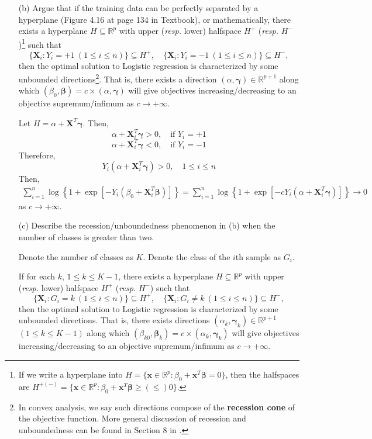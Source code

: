 \documentclass[10pt]{article}
\theoremstyle{definition}
\theoremstyle{remark}
\newcommand{\bx}{\bm{x}}
\newcommand{\Xb}{\mathbf{X}}
\newcommand{\bX}{\bm{X}}
\newcommand{\bbeta}{\bm{\beta}}
\newcommand{\bgamma}{\bm{\gamma}}
\newcommand{\bbR}{\mathbb{R}}
\begin{document}
\begin{enumerate}
\begin{itemize}
		\item [(b)] Argue that if the training data can be perfectly separated by a hyperplane (Figure 4.16 at page 134 in Textbook), or mathematically, there exists a hyperplane $ H \subseteq \bbR^{p} $ with upper (\textit{resp.} lower) halfspace $ H^{+} $ (\textit{resp.} $ H^{-} $)\footnote{If we write a hyperplane into $ H = \{ \bx \in \bbR^{p}: \beta_{0} + \bx^{T}\bbeta = 0 \} $, then the halfspaces are $ H^{+(-)} = \{ \bx \in \bbR^{p}: \beta_{0} + \bx^{T}\bbeta \ge(\le) 0 \} $.} such that 
		\[ \{ \bX_{i}: Y_{i} = + 1\ (1 \le i \le n) \} \subseteq H^{+}, \quad \{ \bX_{i}: Y_{i} = -1\ (1 \le i \le n) \} \subseteq H^{-}, \]
		then the optimal solution to Logistic regression is characterized by some unbounded directions\footnote{In convex analysis, we say such directions compose of the \textbf{recession cone} of the objective function. More general discussion of recession and unboundedness can be found in Section 8 in \cite[Rockafellar (1970)]{rockafellar1970convex}.}. That is, there exists a direction $ (\alpha,\bgamma) \in \bbR^{p+1} $ along which $ (\beta_{0},\bbeta) = c\times (\alpha,\bgamma) $ will give objectives increasing/decreasing to an objective supremum/infimum as $ c \to +\infty $.
		
		Let $ H=\alpha + \Xb^T\bgamma $. Then,
		\[
		\alpha+\bX_{i}^{T}\bgamma >0,\quad \textrm{if~} Y_i=+1
		\]
		\[
		\alpha+\bX_{i}^{T}\bgamma <0,\quad \textrm{if~} Y_i=-1
		\]
		Therefore,
		\[
		Y_i(\alpha+\bX_{i}^{T}\bgamma) > 0, \quad 1\le i\le n
		\]
		Then,
		\begin{align*}
		    \sum_{i=1}^{n} \log\left\{ 1 + \exp\left[ -Y_{i}(\beta_{0}+\bX_{i}^{T}\bbeta) \right]  \right\} = \sum_{i=1}^{n} \log\left\{ 1 + \exp\left[ -cY_{i}(\alpha+\bX_{i}^{T}\bgamma) \right]  \right\} \to 0
		\end{align*}
		as $c \to +\infty$.
		
		\item [(c)] Describe the recession/unboundedness phenomenon in (b) when the number of classes is greater than two.
		
		Denote the number of classes as $K$. Denote the class of the $i$th sample as $G_i$.
		
		If for each $k$, $1\le k\le K-1$, there exists a hyperplane $ H \subseteq \bbR^{p} $ with upper (\textit{resp.} lower) halfspace $ H^{+} $ (\textit{resp.} $ H^{-} $) such that 
		\[ \{ \bX_{i}: G_{i} = k \ (1 \le i \le n) \} \subseteq H^{+}, \quad \{ \bX_{i}: G_{i} \ne k\ (1 \le i \le n) \} \subseteq H^{-}, \]
		then the optimal solution to Logistic regression is characterized by some unbounded directions. That is, there exists directions $ (\alpha_k,\bgamma_k) \in \bbR^{p+1}$ $ (1\le k \le K-1)$ along which $ (\beta_{k0},\bbeta_k) = c\times (\alpha_k,\bgamma_k) $ will give objectives increasing/decreasing to an objective supremum/infimum as $ c \to +\infty $.
		
	\end{itemize}
\end{enumerate}
\end{document}
